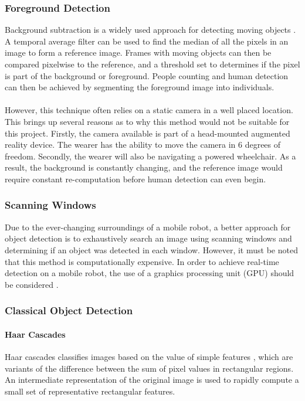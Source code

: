 \subsubsection{Foreground Detection}
Background subtraction is a widely used approach for detecting moving objects \cite{Piccardi2004}. A temporal average filter can be used to find the median of all the pixels in an image to form a reference image. Frames with moving objects can then be compared pixelwise to the reference, and a threshold set to determines if the pixel is part of the background or foreground. People counting and human detection can then be achieved by segmenting the foreground image into individuals.

\paragraph{} However, this technique often relies on a static camera in a well placed location. This brings up several reasons as to why this method would not be suitable for this project. Firstly, the camera available is part of a head-mounted augmented reality device. The wearer has the ability to move the camera in 6 degrees of freedom. Secondly, the wearer will also be navigating a powered wheelchair. As a result, the background is constantly changing, and the reference image would require constant re-computation before human detection can even begin.

\subsubsection{Scanning Windows}
Due to the ever-changing surroundings of a mobile robot, a better approach for object detection is to exhaustively search an image using scanning windows and determining if an object was detected in each window. However, it must be noted that this method is computationally expensive. In order to achieve real-time detection on a mobile robot, the use of a graphics processing unit (GPU) should be considered \cite{Hirabayashi}.

\subsubsection{Classical Object Detection}

\paragraph{Haar Cascades}
Haar cascades classifies images based on the value of simple features \cite{Viola2001}, which are variants of the difference between the sum of pixel values in rectangular regions. An intermediate representation of the original image is used to rapidly compute a small set of representative rectangular features.

